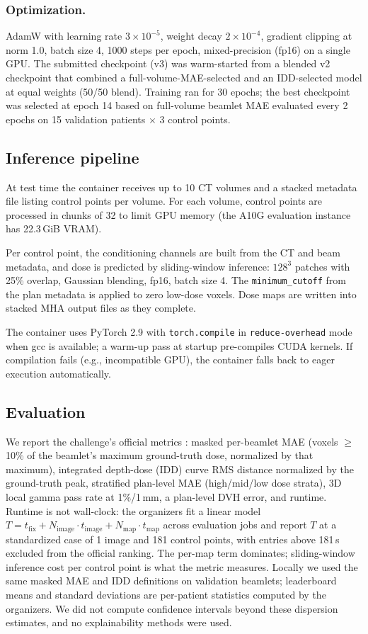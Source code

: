 \documentclass[runningheads]{llncs}
\begin{document}
\subsubsection{Optimization.}
AdamW with learning rate $3\times10^{-5}$, weight decay $2\times10^{-4}$, gradient clipping at norm 1.0, batch size 4, 1000 steps per epoch, mixed-precision (fp16) on a single GPU. The submitted checkpoint (v3) was warm-started from a blended v2 checkpoint that combined a full-volume-MAE-selected and an IDD-selected model at equal weights (50/50 blend). Training ran for 30 epochs; the best checkpoint was selected at epoch 14 based on full-volume beamlet MAE evaluated every 2 epochs on 15 validation patients $\times$ 3 control points.

\subsection{Inference pipeline}

At test time the container receives up to 10 CT volumes and a stacked metadata file listing control points per volume. For each volume, control points are processed in chunks of 32 to limit GPU memory (the A10G evaluation instance has 22.3\,GiB VRAM).

Per control point, the conditioning channels are built from the CT and beam metadata, and dose is predicted by sliding-window inference: $128^3$ patches with 25\% overlap, Gaussian blending, fp16, batch size 4. The \texttt{minimum\_cutoff} from the plan metadata is applied to zero low-dose voxels. Dose maps are written into stacked MHA output files as they complete.

The container uses PyTorch 2.9 with \texttt{torch.compile} in \texttt{reduce-overhead} mode when gcc is available; a warm-up pass at startup pre-compiles CUDA kernels. If compilation fails (e.g., incompatible GPU), the container falls back to eager execution automatically.

\subsection{Evaluation}
We report the challenge's official metrics \cite{doserad_metrics}: masked per-beamlet MAE (voxels $\geq$10\% of the beamlet's maximum ground-truth dose, normalized by that maximum), integrated depth-dose (IDD) curve RMS distance normalized by the ground-truth peak, stratified plan-level MAE (high/mid/low dose strata), 3D local gamma pass rate at 1\%/1\,mm, a plan-level DVH error, and runtime. Runtime is not wall-clock: the organizers fit a linear model $T = t_{\mathrm{fix}} + N_{\mathrm{image}} \cdot t_{\mathrm{image}} + N_{\mathrm{map}} \cdot t_{\mathrm{map}}$ across evaluation jobs and report $T$ at a standardized case of 1 image and 181 control points, with entries above 181\,s excluded from the official ranking. The per-map term dominates; sliding-window inference cost per control point is what the metric measures. Locally we used the same masked MAE and IDD definitions on validation beamlets; leaderboard means and standard deviations are per-patient statistics computed by the organizers. We did not compute confidence intervals beyond these dispersion estimates, and no explainability methods were used.
\end{document}
